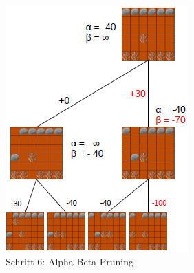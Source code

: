\begin{figure}[h]
	\centering
	\includegraphics{img/ab6}
	\caption{Schritt 6: Alpha-Beta Pruning}
	\label{fig:ab6}
\end{figure}

